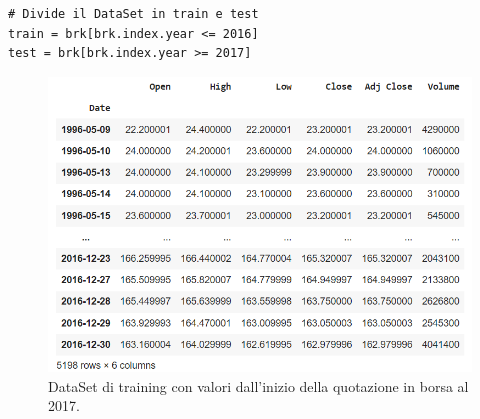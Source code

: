 \documentclass{article}
\begin{document}
\begin{verbatim}
# Divide il DataSet in train e test
train = brk[brk.index.year <= 2016]
test = brk[brk.index.year >= 2017]
\end{verbatim}
\begin{figure}[H]
\centering
\includegraphics[width=1\linewidth]{train.png}
\caption{\label{fig:train_dataset}DataSet di training con valori dall'inizio della quotazione in borsa al 2017.}
\end{figure}
\end{document}
